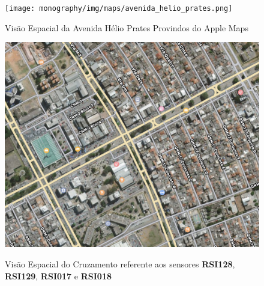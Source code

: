 \begin{figure}[t]
    \centering
    \texttt{[image: monography/img/maps/avenida\_helio\_prates.png]}
    \label{figure:helio}
    \caption[Visão Espacial da Avenida Hélio Prates Provindos do Apple Maps]{Visão Espacial da Avenida Hélio Prates Provindos do Apple Maps}
\end{figure}


\begin{figure}[t]
    \centering
    \includegraphics[scale=0.6]{monography/img/maps/cruzamento_1.png}
    \label{figure:helio_cruzamento_1}
    \caption[Visão Espacial do Cruzamento referente aos sensores \textbf{RSI128}, \textbf{RSI129}, \textbf{RSI017} e \textbf{RSI018}]{Visão Espacial do Cruzamento referente aos sensores \textbf{RSI128}, \textbf{RSI129}, \textbf{RSI017} e \textbf{RSI018}}
\end{figure}


